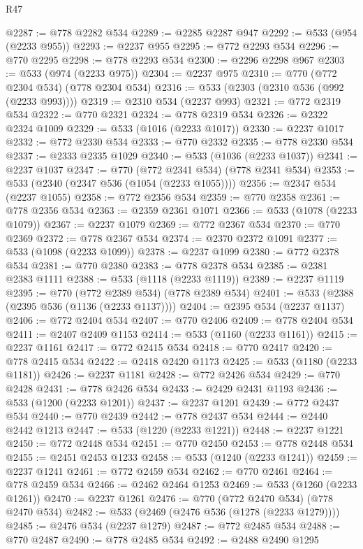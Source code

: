 \begin{lexlean}{R47}
\begin{coremodule}
@2287 := @778 @2282 @534
@2289 := @2285 @2287 @947
@2292 := @533 (@954 (@2233 @955))
@2293 := @2237 @955
@2295 := @772 @2293 @534
@2296 := @770 @2295
@2298 := @778 @2293 @534
@2300 := @2296 @2298 @967
@2303 := @533 (@974 (@2233 @975))
@2304 := @2237 @975
@2310 := @770 (@772 @2304 @534) (@778 @2304 @534)
@2316 := @533 (@2303 (@2310 @536 (@992 (@2233 @993))))
@2319 := @2310 @534 (@2237 @993)
@2321 := @772 @2319 @534
@2322 := @770 @2321
@2324 := @778 @2319 @534
@2326 := @2322 @2324 @1009
@2329 := @533 (@1016 (@2233 @1017))
@2330 := @2237 @1017
@2332 := @772 @2330 @534
@2333 := @770 @2332
@2335 := @778 @2330 @534
@2337 := @2333 @2335 @1029
@2340 := @533 (@1036 (@2233 @1037))
@2341 := @2237 @1037
@2347 := @770 (@772 @2341 @534) (@778 @2341 @534)
@2353 := @533 (@2340 (@2347 @536 (@1054 (@2233 @1055))))
@2356 := @2347 @534 (@2237 @1055)
@2358 := @772 @2356 @534
@2359 := @770 @2358
@2361 := @778 @2356 @534
@2363 := @2359 @2361 @1071
@2366 := @533 (@1078 (@2233 @1079))
@2367 := @2237 @1079
@2369 := @772 @2367 @534
@2370 := @770 @2369
@2372 := @778 @2367 @534
@2374 := @2370 @2372 @1091
@2377 := @533 (@1098 (@2233 @1099))
@2378 := @2237 @1099
@2380 := @772 @2378 @534
@2381 := @770 @2380
@2383 := @778 @2378 @534
@2385 := @2381 @2383 @1111
@2388 := @533 (@1118 (@2233 @1119))
@2389 := @2237 @1119
@2395 := @770 (@772 @2389 @534) (@778 @2389 @534)
@2401 := @533 (@2388 (@2395 @536 (@1136 (@2233 @1137))))
@2404 := @2395 @534 (@2237 @1137)
@2406 := @772 @2404 @534
@2407 := @770 @2406
@2409 := @778 @2404 @534
@2411 := @2407 @2409 @1153
@2414 := @533 (@1160 (@2233 @1161))
@2415 := @2237 @1161
@2417 := @772 @2415 @534
@2418 := @770 @2417
@2420 := @778 @2415 @534
@2422 := @2418 @2420 @1173
@2425 := @533 (@1180 (@2233 @1181))
@2426 := @2237 @1181
@2428 := @772 @2426 @534
@2429 := @770 @2428
@2431 := @778 @2426 @534
@2433 := @2429 @2431 @1193
@2436 := @533 (@1200 (@2233 @1201))
@2437 := @2237 @1201
@2439 := @772 @2437 @534
@2440 := @770 @2439
@2442 := @778 @2437 @534
@2444 := @2440 @2442 @1213
@2447 := @533 (@1220 (@2233 @1221))
@2448 := @2237 @1221
@2450 := @772 @2448 @534
@2451 := @770 @2450
@2453 := @778 @2448 @534
@2455 := @2451 @2453 @1233
@2458 := @533 (@1240 (@2233 @1241))
@2459 := @2237 @1241
@2461 := @772 @2459 @534
@2462 := @770 @2461
@2464 := @778 @2459 @534
@2466 := @2462 @2464 @1253
@2469 := @533 (@1260 (@2233 @1261))
@2470 := @2237 @1261
@2476 := @770 (@772 @2470 @534) (@778 @2470 @534)
@2482 := @533 (@2469 (@2476 @536 (@1278 (@2233 @1279))))
@2485 := @2476 @534 (@2237 @1279)
@2487 := @772 @2485 @534
@2488 := @770 @2487
@2490 := @778 @2485 @534
@2492 := @2488 @2490 @1295

\end{coremodule}
\end{lexlean}
